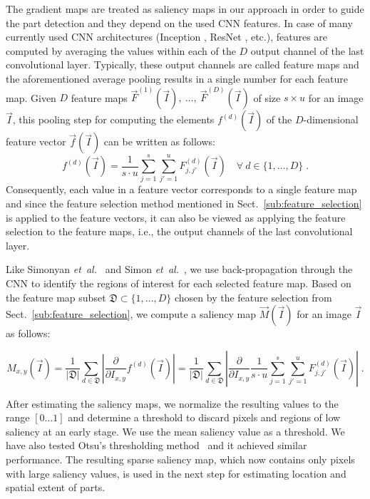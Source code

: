 \documentclass[runningheads]{llncs}
\newcommand{\etal}{\emph{et~al.}}
\begin{document}
The gradient maps are treated as saliency maps in our approach in order to guide the part detection and they depend on the used CNN features.
In case of many currently used CNN architectures (Inception \cite{Szegedy_2016_CVPR}, ResNet \cite{he2016resnet}, etc.), features are computed by averaging the values within each of the $D$ output channel of the last convolutional layer.
Typically, these output channels are called feature maps and the aforementioned average pooling results in a single number for each feature map.
Given $D$ feature maps $\vec{F}^{(1)}(\vec{I}),~\ldots,~\vec{F}^{(D)}(\vec{I})$ of size $s \times u$ for an image $\vec{I}$, this pooling step for computing the elements $f^{(d)}(\vec{I})$ of the $D$-dimensional feature vector $\vec{f}(\vec{I})$ can be written as follows:
\vspace{-.2cm}
\begin{equation}
f^{(d)}(\vec{I}) = \dfrac{1}{s \cdot u}\sum_{j=1}^s \sum_{j'=1}^u F_{j,j'}^{(d)}(\vec{I})\quad\forall\ d\in\{1,\dots,D\} \; .
\end{equation}
Consequently, each value in a feature vector corresponds to a single feature map and since the feature selection method mentioned in Sect.~\ref{sub:feature_selection} is applied to the feature vectors, it can also be viewed as applying the feature selection to the feature maps, i.e., the output channels of the last convolutional layer.

Like Simonyan \etal~\cite{simonyan2013deep} and Simon \etal~\cite{Simon_2015_ICCV}, we use back-propagation through the CNN to identify the regions of interest for each selected feature map.
Based on the feature map subset $\mathfrak{D} \subset \{1, \dots, D\}$ chosen by the feature selection from Sect.~\ref{sub:feature_selection}, we compute a saliency map $\vec{M}(\vec{I})$ for an image $\vec{I}$ as follows:


\vspace{-.2cm}
\begin{equation}
	\label{eq:saliency_sum}
	M_{x,y}(\vec{I})
	  = \dfrac{1}{|\mathfrak{D}|} \sum_{d \in \mathfrak{D}} \left| \dfrac{\partial}{\partial I_{x,y}} f^{(d)}(\vec{I}) \right|
	  = \dfrac{1}{|\mathfrak{D}|} \sum_{d \in \mathfrak{D}} \left| \dfrac{\partial}{\partial I_{x,y}} \dfrac{1}{s \cdot u}\sum_{j=1}^s \sum_{j'=1}^u F_{j,j'}^{(d)}(\vec{I}) \right| \;  .
\end{equation}


After estimating the saliency maps, we normalize the resulting values to the range $[0 \dots 1]$ and determine a threshold to discard pixels and regions of low saliency at an early stage.
We use the mean saliency value as a threshold.
We have also tested Otsu's thresholding method~\cite{otsu1979threshold} and it achieved similar performance.
The resulting sparse saliency map, which now contains only pixels with large saliency values, is used in the next step for estimating location and spatial extent of parts.
\end{document}
